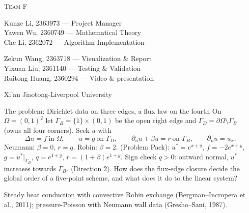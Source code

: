 \documentclass[aspectratio=169,8pt,t]{beamer}
\newcommand{\GD}{\Gamma_D}\newcommand{\GB}{\Gamma_B}\newcommand{\dd}{\,\mathrm{d}}
\begin{document}
{\begin{frame}[plain]
\begin{minipage}{0.86\textwidth}
{\textsc{Team F}}\par\vspace{1.6mm}
{\footnotesize
\begin{minipage}[t]{0.46\textwidth}\raggedright
Kunze Li, 2363973 --- Project Manager\\
Yawen Wu, 2360749 --- Mathematical Theory\\
Che Li, 2362072 --- Algorithm Implementation
\end{minipage}\hfill
\begin{minipage}[t]{0.50\textwidth}\raggedright
Zekun Wang, 2363718 --- Visualization \& Report\\
Yixuan Liu, 2361140 --- Testing \& Validation\\
Ruitong Huang, 2360294 --- Video \& presentation
\end{minipage}\par}\vspace{3.5mm}
{\color{accent}\footnotesize Xi'an Jiaotong-Liverpool University}\par
\end{minipage}
\vspace*{0pt plus 1.25filll}
\end{frame}}

\begin{frame}{The problem: Dirichlet data on three edges, a flux law on the fourth}
\bodytop
On $\Omega=(0,1)^2$ let $\GB=\{1\}\times(0,1)$ be the open right edge and $\GD=\partial\Omega\setminus\GB$ (owns all four corners). Seek $u$ with
\[
-\Delta u=f\ \text{in }\Omega,\qquad u=g\ \text{on }\GD,\qquad \partial_n u+\beta u=r\ \text{on }\GB,\qquad \partial_n u=u_x .
\]
Neumann: $\beta=0$, $r=q$. Robin: $\beta=2$.
\blockgap
{} (Problem Pack): $u^*=e^{x+y}$, $f=-2e^{x+y}$, $g=u^*|_{\GD}$, $q=e^{1+y}$, $r=(1+\beta)e^{1+y}$. Sign check $q>0$: outward normal, $u^*$ increases towards $\GB$.
\blockgap
{} (Direction 2). How does the flux-edge closure decide the global order of a five-point scheme, and what does it do to the linear system?
\closing{Steady heat conduction with convective Robin exchange (Bergman--Incropera et al., 2011); pressure-Poisson with Neumann wall data (Gresho--Sani, 1987).}
\end{frame}
\end{document}
